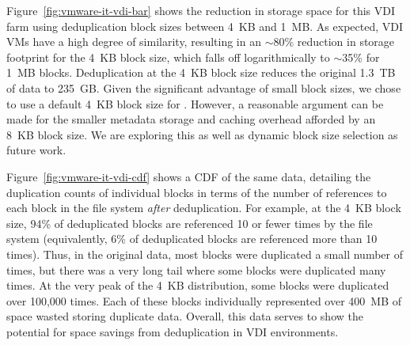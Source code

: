 Figure~\ref{fig:vmware-it-vdi-bar} shows the reduction in storage
space for this VDI farm using deduplication block sizes between 4~KB
and 1~MB. As expected, VDI VMs have a high degree of similarity,
resulting in an $\sim$80\% reduction in storage footprint for the 4~KB
block size, which falls off logarithmically to $\sim$35\% for 1~MB
blocks.  Deduplication at the 4~KB block size reduces the
original 1.3~TB of data to 235~GB.  Given the significant advantage of
small block sizes, we chose to use a default 4~KB block size
for \DeDe.  However, a reasonable argument can be made for the smaller
metadata storage and caching overhead afforded by an 8~KB block size.
We are exploring this as well as dynamic block size selection as
future work.


Figure~\ref{fig:vmware-it-vdi-cdf} shows a CDF of the same data,
detailing the duplication counts of individual blocks in terms of
the number of references to each block in the file
system \emph{after} deduplication.  For example, at the 4~KB block
size, 94\% of deduplicated blocks are referenced 10 or fewer times by
the file system (equivalently, 6\% of deduplicated blocks are
referenced more than 10 times).  Thus, in the original data, most
blocks were duplicated a small number of times, but there was a very
long tail where some blocks were duplicated many times.  At the very
peak of the 4~KB distribution, some blocks were duplicated over
100,000 times.  Each of these blocks individually represented over
400~MB of space wasted storing duplicate data. Overall, this data
serves to show the potential for space savings from deduplication in
VDI environments.


